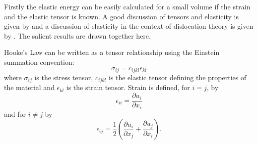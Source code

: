 Firstly the elastic energy can be easily calculated for a small volume if the strain and the elastic tensor is known. A good discussion of tensors and elasticity is given by \citet{kelly_knowles2012chapter5_tensors,kelly_knowles2012chapter6_stress_strain} and a discussion of elasticity in the context of dislocation theory is given by \citet{hirth_lothe1982elasticity}. The salient results are drawn together here.

Hooke's Law can be written as a tensor relationship using the Einstein summation convention:
\begin{equation}
\sigma_{ij} = c_{ijkl} \epsilon_{kl}
\end{equation}
where $\sigma_{ij}$ is the stress tensor, $c_{ijkl}$ is the elastic tensor defining the properties of the material and $\epsilon_{kl}$ is the strain tensor. Strain is defined, for $i=j$, by
\begin{equation}
\epsilon_{ii} = \frac{\partial u_i}{\partial x_i}
\end{equation}
and for $i\neq j$ by
\begin{equation}
\epsilon_{ij} = \frac{1}{2} \left( \frac{\partial u_i}{\partial x_j} + \frac{\partial u_j}{\partial x_i} \right).
\end{equation}
